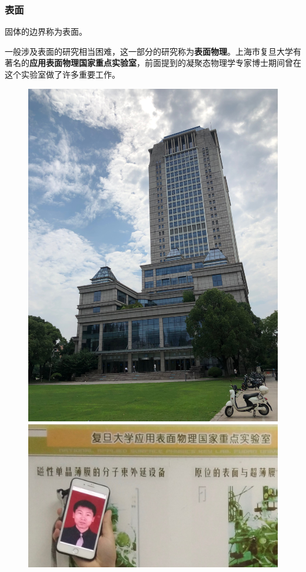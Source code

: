 \documentclass[CJK]{beamer}
\begin{document}
\begin{frame}
\frametitle{\bch 表面 \ech}
\bch
固体的边界称为表面。\par
一般涉及表面的研究相当困难，这一部分的研究称为{\bf 表面物理}。上海市复旦大学有著名的{\bf 应用表面物理国家重点实验室}，前面提到的凝聚态物理学专家博士期间曾在这个实验室做了许多重要工作。
\begin{figure}[h!]
\includegraphics[scale=0.021]{fudan}
\includegraphics[scale=0.12]{surface}
\end{figure}
\ech
\end{frame}
\end{document}
